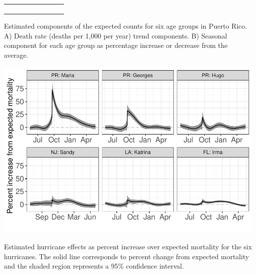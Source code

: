\documentclass[11pt]{article}
\begin{document}
\begin{suppfigure}[ht]
\begin{tabular}{lll}
\begin{subfigure}[t]{0.49\linewidth}
	\end{subfigure}&\\
    \end{tabular}
    \caption{Estimated components of the expected counts for six age groups in Puerto Rico. A) Death rate (deaths per 1,000 per year) trend components. B) Seasonal component for each age group as percentage increase or decrease from the average.}
    \label{supp-fig:model-components}
\end{suppfigure}

\begin{suppfigure}[ht]
	\centering
	\includegraphics[width=1\linewidth]{figs/supp-figure-2.pdf} 
    \caption{Estimated hurricane effects as percent increase over expected mortality for the six hurricanes. The solid line corresponds to percent change from expected mortality and the shaded region represents a 95\% confidence interval.}
	\label{supp-fig:hurricane-effects}
\end{suppfigure}
\end{document}
